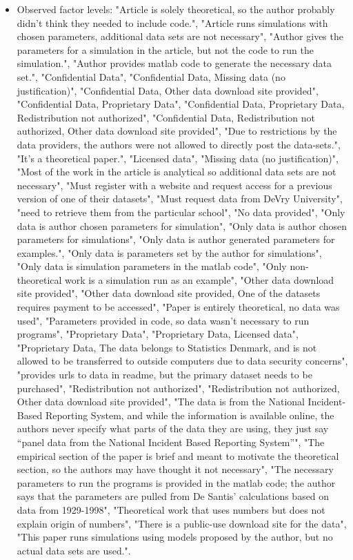 \documentclass[]{article}
\providecommand{\tightlist}{%
  \setlength{\itemsep}{0pt}\setlength{\parskip}{0pt}}
\begin{document}
\begin{itemize}
\tightlist
\item
  Observed factor levels: "Article is solely theoretical, so the author
  probably didn't think they needed to include code.", "Article runs
  simulations with chosen parameters, additional data sets are not
  necessary", "Author gives the parameters for a simulation in the
  article, but not the code to run the simulation.", "Author provides
  matlab code to generate the necessary data set.", "Confidential Data",
  "Confidential Data, Missing data (no justification)", "Confidential
  Data, Other data download site provided", "Confidential Data,
  Proprietary Data", "Confidential Data, Proprietary Data,
  Redistribution not authorized", "Confidential Data, Redistribution not
  authorized, Other data download site provided", "Due to restrictions
  by the data providers, the authors were not allowed to directly post
  the data-sets.", "It's a theoretical paper.", "Licensed data",
  "Missing data (no justification)", "Most of the work in the article is
  analytical so additional data sets are not necessary", "Must register
  with a website and request access for a previous version of one of
  their datasets", "Must request data from DeVry University", "need to
  retrieve them from the particular school", "No data provided", "Only
  data is author chosen parameters for simulation", "Only data is author
  chosen parameters for simulations", "Only data is author generated
  parameters for examples.", "Only data is parameters set by the author
  for simulations", "Only data is simulation parameters in the matlab
  code", "Only non-theoretical work is a simulation run as an example",
  "Other data download site provided", "Other data download site
  provided, One of the datasets requires payment to be accessed", "Paper
  is entirely theoretical, no data was used", "Parameters provided in
  code, so data wasn't necessary to run programs", "Proprietary Data",
  "Proprietary Data, Licensed data", "Proprietary Data, The data belongs
  to Statistics Denmark, and is not allowed to be transferred to outside
  computers due to data security concerns", "provides urls to data in
  readme, but the primary dataset needs to be purchased",
  "Redistribution not authorized", "Redistribution not authorized, Other
  data download site provided", "The data is from the National
  Incident-Based Reporting System, and while the information is
  available online, the authors never specify what parts of the data
  they are using, they just say ``panel data from the National Incident
  Based Reporting System''", "The empirical section of the paper is
  brief and meant to motivate the theoretical section, so the authors
  may have thought it not necessary", "The necessary parameters to run
  the programs is provided in the matlab code; the author says that the
  parameters are pulled from De Santis' calculations based on data from
  1929-1998", "Theoretical work that uses numbers but does not explain
  origin of numbers", "There is a public-use download site for the
  data", "This paper runs simulations using models proposed by the
  author, but no actual data sets are used.".
\end{itemize}
\end{document}
